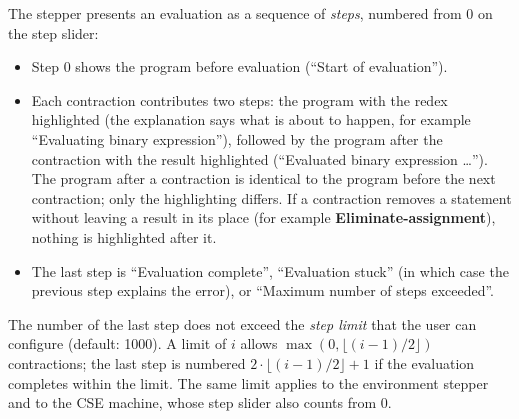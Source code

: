 The stepper presents an evaluation as a sequence of \emph{steps}, numbered
from 0 on the step slider:
\begin{itemize}
\item Step 0 shows the program before evaluation (``Start of evaluation'').
\item Each contraction contributes two steps: the program with the redex
  highlighted (the explanation says what is about to happen, for example
  ``Evaluating binary expression''), followed by the program after the
  contraction with the result highlighted (``Evaluated binary expression
  \ldots'').
  The program after a contraction is identical to the program before the next
  contraction; only the highlighting differs. If a contraction removes a
  statement without leaving a result in its place (for example
  \textbf{Eliminate-assignment}), nothing is highlighted after it.
\item The last step is ``Evaluation complete'', ``Evaluation stuck'' (in
  which case the previous step explains the error), or ``Maximum number
  of steps exceeded''.
\end{itemize}

The number of the last step does not exceed the \emph{step limit} that the
user can configure (default: 1000). A limit of $i$ allows
$\max(0, \lfloor (i - 1) / 2 \rfloor)$ contractions; the last step is
numbered $2\cdot\lfloor (i - 1) / 2 \rfloor + 1$ if the evaluation
completes within the limit. The same limit applies to the environment stepper
and to the CSE machine, whose step slider also counts from 0.
